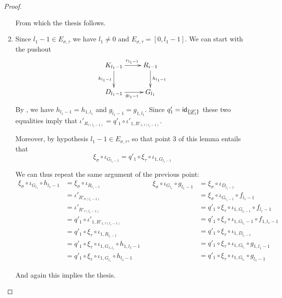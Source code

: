 \begin{proof}
\begin{enumerate}
	From which the thesis follows.
	
			\item Since $l_1-1\in E_{\sigma, \tau}$ we have $l_1\neq 0$ and $E_{\sigma, \tau}=[0,l_1-1]$.  We can start with the pushout
			\[\xymatrix{K_{l_1-1}\ar[r]^{r_{l_1-1}} \ar[d]_{k_{l_1-1}}& R_{i-1} \ar[d]^{h_{l_1-1}}\\ D_{l_1-1} \ar[r]_{g_{l_1-1}}& G_{l_1}}\] 
			By , we have $h_{l_1-1}=h_{1, l_1}$ and $g_{l_1-1}=g_{1,l_1}$. Since $q'_1=\mathsf{id}_{\langle \hspace{-1.85pt}[ \underline{\mathscr{D}}'_1]\hspace{-1.85pt}\rangle}$ these two equalities imply that $	\iota'_{R_{\tau(l_1-1)}}=q'_1\circ \iota'_{1, R'_{1,\tau(l_1-1)}}$. 			
			
			Moreover, by hypothesis $l_1-1\in E_{\sigma, \tau}$, so that point $3$ of this lemma entails that
			\[\xi_\sigma \circ \iota_{G_{l_1-1}}=q'_1 \circ \xi_{\tau} \circ \iota_{1, G_{l_1-1}}\]
			
			We can thus repeat the same argument of the previous point:
			\[\begin{split}
				\xi_\sigma \circ \iota_{G_{l_1}}\circ h_{l_1-1}&=  \xi_\sigma\circ \iota_{R_{l_1-1}}\\&=\iota'_{R'_{\sigma(l_1-1)}}\\&=\iota'_{R'_{\tau(l_1-1)}}\\&=q'_1\circ \iota'_{1, R'_{1,\tau(l_1-1)}}\\&=q'_1\circ \xi_{\tau}\circ \iota_{1, R_{l_1-1}}\\&=q'_1\circ \xi_{\tau} \circ \iota_{1, G_{1,l_1}}\circ h_{1, l_1-1}\\&=q'_1\circ \xi_\tau \circ \iota_{1, G_{l_1}} \circ h_{l_1-1}			\end{split} 
			\quad  \begin{split}
				\xi_\sigma \circ \iota_{G_{l_1}}\circ g_{l_1-1}&=\xi_{\sigma}\circ \iota_{D_{l_1-1}}\\&=\xi_{\sigma}\circ \iota_{G_{l_1-1}} \circ f_{l_1-1}\\&=q'_1 \circ \xi_{\tau} \circ \iota_{1, G_{l_1-1}} \circ f_{l_1-1}\\&=q'_1 \circ \xi_{\tau} \circ \iota_{1, G_{l_1}-1} \circ f_{1, l_1-1}\\&=q'_1 \circ \xi_{\tau} \circ \iota_{1, D_{l_1-1}}\\&=q'_1 \circ \xi_{\tau} \circ \iota_{1, G_{l_1}}\circ g_{1, l_1-1}\\&=q'_1 \circ \xi_{\tau} \circ \iota_{1, G_{l_1}}\circ g_{l_1-1}
			\end{split}\]
		
		And again this implies the thesis.
			

\end{enumerate}
\end{proof}
